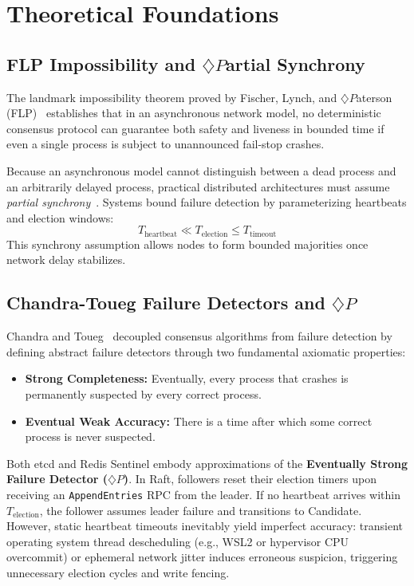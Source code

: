 \documentclass[conference]{IEEEtran}
\begin{document}
\section{Theoretical Foundations}

\subsection{FLP Impossibility and $\diamondsuit P$artial Synchrony}
The landmark impossibility theorem proved by Fischer, Lynch, and $\diamondsuit P$aterson (FLP)~\cite{fischer1985impossibility} establishes that in an asynchronous network model, no deterministic consensus protocol can guarantee both safety and liveness in bounded time if even a single process is subject to unannounced fail-stop crashes.

Because an asynchronous model cannot distinguish between a dead process and an arbitrarily delayed process, practical distributed architectures must assume \textit{partial synchrony}~\cite{dwork1988consensus}. Systems bound failure detection by parameterizing heartbeats and election windows:
\begin{equation}
T_{\text{heartbeat}} \ll T_{\text{election}} \le T_{\text{timeout}}
\end{equation}
This synchrony assumption allows nodes to form bounded majorities once network delay stabilizes.

\subsection{Chandra-Toueg Failure Detectors and $\diamondsuit P$}
Chandra and Toueg~\cite{chandra1996unreliable} decoupled consensus algorithms from failure detection by defining abstract failure detectors through two fundamental axiomatic properties:
\begin{itemize}
    \item \textbf{Strong Completeness:} Eventually, every process that crashes is permanently suspected by every correct process.
    \item \textbf{Eventual Weak Accuracy:} There is a time after which some correct process is never suspected.
\end{itemize}
Both etcd and Redis Sentinel embody approximations of the \textbf{Eventually Strong Failure Detector ($\diamondsuit P$)}. In Raft, followers reset their election timers upon receiving an \texttt{AppendEntries} RPC from the leader. If no heartbeat arrives within $T_{\text{election}}$, the follower assumes leader failure and transitions to Candidate. However, static heartbeat timeouts inevitably yield imperfect accuracy: transient operating system thread descheduling (e.g., WSL2 or hypervisor CPU overcommit) or ephemeral network jitter induces erroneous suspicion, triggering unnecessary election cycles and write fencing.
\end{document}
